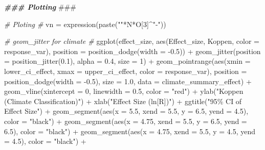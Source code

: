 \documentclass[
]{article}
\newenvironment{Shaded}{\begin{snugshade}}{\end{snugshade}}
\newcommand{\AlertTok}[1]{\textcolor[rgb]{0.94,0.16,0.16}{#1}}
\newcommand{\AttributeTok}[1]{\textcolor[rgb]{0.77,0.63,0.00}{#1}}
\newcommand{\CommentTok}[1]{\textcolor[rgb]{0.56,0.35,0.01}{\textit{#1}}}
\newcommand{\DecValTok}[1]{\textcolor[rgb]{0.00,0.00,0.81}{#1}}
\newcommand{\DocumentationTok}[1]{\textcolor[rgb]{0.56,0.35,0.01}{\textbf{\textit{#1}}}}
\newcommand{\FloatTok}[1]{\textcolor[rgb]{0.00,0.00,0.81}{#1}}
\newcommand{\FunctionTok}[1]{\textcolor[rgb]{0.00,0.00,0.00}{#1}}
\newcommand{\NormalTok}[1]{#1}
\newcommand{\OtherTok}[1]{\textcolor[rgb]{0.56,0.35,0.01}{#1}}
\newcommand{\SpecialCharTok}[1]{\textcolor[rgb]{0.00,0.00,0.00}{#1}}
\newcommand{\StringTok}[1]{\textcolor[rgb]{0.31,0.60,0.02}{#1}}
\begin{document}
\begin{Shaded}
\begin{Highlighting}[]
\DocumentationTok{\#\#\# Plotting }\AlertTok{\#\#\#}

\CommentTok{\# Ploting \#}
\NormalTok{vn }\OtherTok{=} \FunctionTok{expression}\NormalTok{(}\FunctionTok{paste}\NormalTok{(}\StringTok{""}\SpecialCharTok{*}\NormalTok{N}\SpecialCharTok{*}\NormalTok{O[}\DecValTok{3}\NormalTok{]}\SpecialCharTok{\^{}}\StringTok{"{-}"}\NormalTok{))}

\CommentTok{\# geom\_jitter for climate \# }
\FunctionTok{ggplot}\NormalTok{(effect\_size, }\FunctionTok{aes}\NormalTok{(Effect\_size, Koppen, }\AttributeTok{color =}\NormalTok{ response\_var),}
       \AttributeTok{position =} \FunctionTok{position\_dodge}\NormalTok{(}\AttributeTok{width =} \SpecialCharTok{{-}}\FloatTok{0.5}\NormalTok{)) }\SpecialCharTok{+}
  \FunctionTok{geom\_jitter}\NormalTok{(}\AttributeTok{position =} \FunctionTok{position\_jitter}\NormalTok{(}\FloatTok{0.1}\NormalTok{), }\AttributeTok{alpha =} \FloatTok{0.4}\NormalTok{, }\AttributeTok{size =} \DecValTok{1}\NormalTok{) }\SpecialCharTok{+}
  \FunctionTok{geom\_pointrange}\NormalTok{(}\FunctionTok{aes}\NormalTok{(}\AttributeTok{xmin =}\NormalTok{ lower\_ci\_effect, }\AttributeTok{xmax =}\NormalTok{ upper\_ci\_effect, }
                      \AttributeTok{color =}\NormalTok{ response\_var),}
                      \AttributeTok{position =} \FunctionTok{position\_dodge}\NormalTok{(}\AttributeTok{width =} \SpecialCharTok{{-}}\FloatTok{0.5}\NormalTok{), }\AttributeTok{size =} \FloatTok{1.0}\NormalTok{, }\AttributeTok{data =}\NormalTok{ climate\_summary\_effect) }\SpecialCharTok{+}
  \FunctionTok{geom\_vline}\NormalTok{(}\AttributeTok{xintercept =} \DecValTok{0}\NormalTok{, }\AttributeTok{linewidth =} \FloatTok{0.5}\NormalTok{, }\AttributeTok{color =} \StringTok{"red"}\NormalTok{) }\SpecialCharTok{+}
  \FunctionTok{ylab}\NormalTok{(}\StringTok{"Koppen (Climate Classification)"}\NormalTok{) }\SpecialCharTok{+}
  \FunctionTok{xlab}\NormalTok{(}\StringTok{"Effect Size (ln[R])"}\NormalTok{) }\SpecialCharTok{+}
  \FunctionTok{ggtitle}\NormalTok{(}\StringTok{"95\% CI of Effect Size"}\NormalTok{) }\SpecialCharTok{+}
  \FunctionTok{geom\_segment}\NormalTok{(}\FunctionTok{aes}\NormalTok{(}\AttributeTok{x =} \FloatTok{5.5}\NormalTok{, }\AttributeTok{xend =} \FloatTok{5.5}\NormalTok{, }\AttributeTok{y =} \FloatTok{6.5}\NormalTok{, }\AttributeTok{yend =} \FloatTok{4.5}\NormalTok{), }\AttributeTok{color =} \StringTok{"black"}\NormalTok{) }\SpecialCharTok{+}
  \FunctionTok{geom\_segment}\NormalTok{(}\FunctionTok{aes}\NormalTok{(}\AttributeTok{x =} \FloatTok{4.75}\NormalTok{, }\AttributeTok{xend =} \FloatTok{5.5}\NormalTok{, }\AttributeTok{y =} \FloatTok{6.5}\NormalTok{, }\AttributeTok{yend =} \FloatTok{6.5}\NormalTok{), }\AttributeTok{color =} \StringTok{"black"}\NormalTok{) }\SpecialCharTok{+}
  \FunctionTok{geom\_segment}\NormalTok{(}\FunctionTok{aes}\NormalTok{(}\AttributeTok{x =} \FloatTok{4.75}\NormalTok{, }\AttributeTok{xend =} \FloatTok{5.5}\NormalTok{, }\AttributeTok{y =} \FloatTok{4.5}\NormalTok{, }\AttributeTok{yend =} \FloatTok{4.5}\NormalTok{), }\AttributeTok{color =} \StringTok{"black"}\NormalTok{) }\SpecialCharTok{+}
  

\end{Highlighting}
\end{Shaded}
\end{document}
